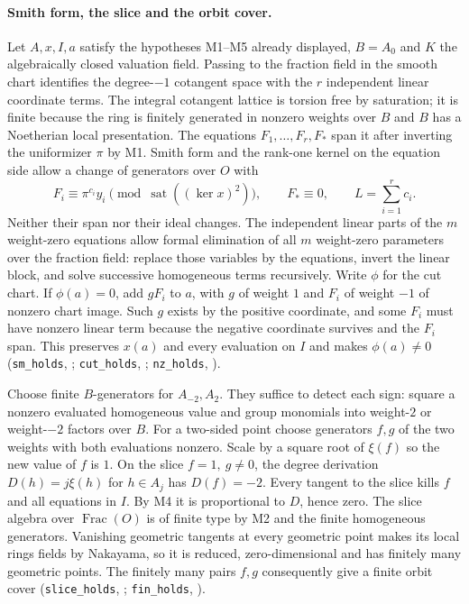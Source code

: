\paragraph{Smith form, the slice and the orbit cover.}
Let $A,x,I,a$ satisfy the hypotheses M1--M5 already displayed,
$B=A_0$ and $K$ the algebraically closed valuation field. Passing to
the fraction field in the smooth chart identifies the degree-$-1$
cotangent space with the $r$ independent linear coordinate terms.
The integral cotangent lattice is torsion free by saturation; it is
finite because the ring is finitely generated in nonzero weights
over $B$ and $B$ has a Noetherian local presentation. The equations
$F_1,\dots,F_r,F_*$ span it after inverting the uniformizer $\pi$
by M1. Smith form and the rank-one kernel on the equation side allow
a change of generators over $O$ with
\[
 F_i\equiv\pi^{c_i}y_i\pmod{\operatorname{sat}((\ker x)^2)},
 \qquad F_*\equiv0,\qquad L=\sum_{i=1}^r c_i .
\]
Neither their span nor their ideal changes. The independent linear
parts of the $m$ weight-zero equations allow formal elimination of
all $m$ weight-zero parameters over the fraction field: replace
those variables by the equations, invert the linear block, and solve
successive homogeneous terms recursively. Write $\phi$ for the cut
chart. If $\phi(a)=0$, add $gF_i$ to $a$, with $g$ of weight $1$
and $F_i$ of weight $-1$ of nonzero chart image. Such $g$ exists by
the positive coordinate, and some $F_i$ must have nonzero linear term
because the negative coordinate survives and the $F_i$ span. This
preserves $x(a)$ and every evaluation on $I$ and makes $\phi(a)\ne0$
(\nolinkurl{sm_holds}, ;
\nolinkurl{cut_holds}, ;
\nolinkurl{nz_holds}, ).

Choose finite $B$-generators for $A_{-2},A_2$. They suffice to
detect each sign: square a nonzero evaluated homogeneous value and
group monomials into weight-$2$ or weight-$-2$ factors over $B$.
For a two-sided point choose generators $f,g$ of the two weights
with both evaluations nonzero. Scale by a square root of $\xi(f)$
so the new value of $f$ is $1$. On the slice $f=1,\ g\ne0$, the
degree derivation $D(h)=j\xi(h)$ for $h\in A_j$ has $D(f)=-2$.
Every tangent to the slice kills $f$ and all equations in $I$.
By M4 it is proportional to $D$, hence zero. The slice algebra over
$\operatorname{Frac}(O)$ is of finite type by M2 and the finite
homogeneous generators. Vanishing geometric tangents at every
geometric point makes its local rings fields by Nakayama, so it is
reduced, zero-dimensional and has finitely many geometric points.
The finitely many pairs $f,g$ consequently give a finite orbit cover
(\nolinkurl{slice_holds}, ;
\nolinkurl{fin_holds}, ).

